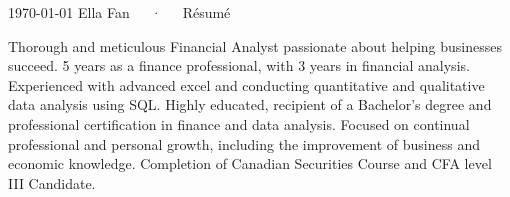 \documentclass[11pt, a4paper]{awesome-cv}
\begin{document}
\makecvheader[C]

\makecvfooter
  {\today}
  {Ella Fan~~~·~~~Résumé}
  {\thepage}


% 
% 
% 
% 
% 



\begin{cvparagraph}

Thorough and meticulous Financial Analyst passionate about helping businesses succeed.
5 years as a finance professional, with 3 years in financial analysis.
Experienced with advanced excel and conducting quantitative and qualitative data analysis using SQL.
Highly educated, recipient of a Bachelor's degree and professional certification in finance and data analysis. 
Focused on continual professional and personal growth, including the improvement of business and economic knowledge.
Completion of Canadian Securities Course and CFA level III Candidate.
\end{cvparagraph}

\end{document}
